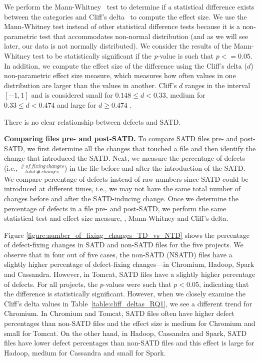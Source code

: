We perform the Mann-Whitney~\cite{mann1947test} test to determine if a statistical difference exists between the categories and Cliff's delta~\cite{Cliff:2005} to compute the effect size. We use the Mann-Whitney test instead of other statistical difference tests because it is a non-parametric test that accommodates non-normal distribution (and as we will see later, our data is not normally distributed). We consider the results of the Mann-Whitney test to be statistically significant if the \textit{p}-value is such that $p <= 0.05$. In addition, we compute the effect size of the difference using the Cliff's delta ($d$) non-parametric effect size measure, which measures how often values in one distribution are larger than the values in another. Cliff's $d$ ranges in  the interval $[-1,1]$ and is considered small for $0.148 \le d < 0.33$, medium for $0.33 \le d < 0.474$ and large for $d \ge 0.474$ \cite{grissom2005effect}.

\begin{myboxii}
	There is no clear relationship between defects and SATD.
\end{myboxii}

\noindent\textbf{Comparing files pre- and post-SATD.} To compare SATD files pre- and post-SATD, we first determine all the changes that touched a file and then identify the change that introduced the SATD. Next, we measure the percentage of defects (i.e., $\frac{\#~of~fixing~changes}{total~\#~changes}$) in the file before and after the introduction of the SATD. We compare percentage of defects instead of raw numbers since SATD could be introduced at different times, i.e., we may not have the same total number of changes before and after the SATD-inducing change. Once we determine the percentage of defects in a file pre- and post-SATD, we perform the same statistical test and effect size measure, \ie{}, Mann-Whitney and Cliff's delta.


 Figure \ref{figure:number_of_fixing_changes_TD_vs_NTD} shows the percentage of defect-fixing changes in SATD and non-SATD files for the five projects. We observe that in four out of five cases, the non-SATD (NSATD) files have a slightly higher percentage of defect-fixing changes---in Chromium, Hadoop, Spark and Cassandra. However, in Tomcat, SATD files have a slightly higher percentage of defects. For all projects, the $p$-values were such that $p < 0.05$, indicating that the difference is statistically significant. However, when we closely examine the Cliff's delta values in Table~\ref{table:cliff_deltas_RQ1}, we see a different trend for Chromium. In Chromium and Tomcat, SATD files often have higher defect percentages than non-SATD files and the effect size is medium for Chromium and small for Tomcat. On the other hand, in Hadoop, Cassandra and Spark, SATD files have lower defect percentages than non-SATD files and this effect is large for Hadoop, medium for Cassandra and small for Spark.

